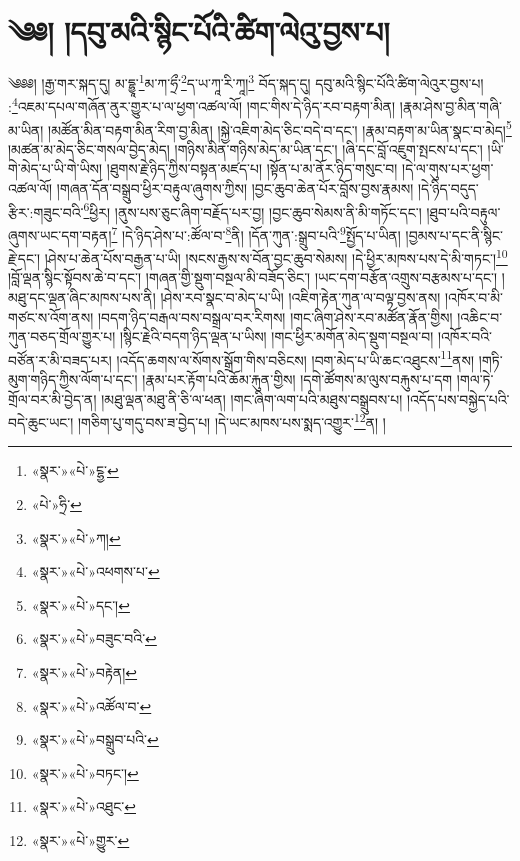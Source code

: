 \chapter{༄༅། །དབུ་མའི་སྙིང་པོའི་ཚིག་ལེའུ་བྱས་པ།}༄༅༅། །རྒྱ་གར་སྐད་དུ། མ་དྷྱཱ་\footnote{«སྣར་»«པེ་»ངྷྱ་}མ་ཀ་ཧྲྀ་\footnote{«པེ་»ཧྲི་}ད་ཡ་ཀཱ་རི་ཀཱ།\footnote{«སྣར་»«པེ་»ཀ།} བོད་སྐད་དུ། དབུ་མའི་སྙིང་པོའི་ཚིག་ལེའུར་བྱས་པ། :\footnote{«སྣར་»«པེ་»འཕགས་པ་}འཇམ་དཔལ་གཞོན་ནུར་གྱུར་པ་ལ་ཕྱག་འཚལ་ལོ། །གང་གིས་དེ་ཉིད་རབ་བརྟག་མིན། །རྣམ་ཤེས་བྱ་མིན་གཞི་མ་ཡིན། །མཚོན་མིན་བརྟག་མིན་རིག་བྱ་མིན། །སྐྱེ་འཇིག་མེད་ཅིང་བདེ་བ་དང་། །རྣམ་བརྟག་མ་ཡིན་སྣང་བ་མེད།\footnote{«སྣར་»«པེ་»དང་།} །མཚན་མ་མེད་ཅིང་གསལ་བྱེད་མེད། །གཉིས་མིན་གཉིས་མེད་མ་ཡིན་དང་། །ཞི་དང་བློ་འཇུག་སྤངས་པ་དང་། །ཡི་གེ་མེད་པ་ཡི་གེ་ཡིས། །ཐུགས་རྗེ་ཉིད་ཀྱིས་བསྟན་མཛད་པ། །སྟོན་པ་མ་ནོར་ཉིད་གསུང་བ། །དེ་ལ་གུས་པར་ཕྱག་འཚལ་ལོ། །གཞན་དོན་བསྒྲུབ་ཕྱིར་བརྟུལ་ཞུགས་ཀྱིས། །བྱང་ཆུབ་ཆེན་པོར་བློས་བྱས་རྣམས། །དེ་ཉིད་བདུད་རྩིར་:གཟུང་བའི་\footnote{«སྣར་»«པེ་»བཟུང་བའི་}ཕྱིར། །ནུས་པས་ཅུང་ཞིག་བརྗོད་པར་བྱ། །བྱང་ཆུབ་སེམས་ནི་མི་གཏོང་དང་། །ཐུབ་པའི་བརྟུལ་ཞུགས་ཡང་དག་བརྟན།\footnote{«སྣར་»«པེ་»བརྟེན།} །དེ་ཉིད་ཤེས་པ་:ཚོལ་བ་\footnote{«སྣར་»«པེ་»འཚོལ་བ་}ནི། །དོན་ཀུན་:སྒྲུབ་པའི་\footnote{«སྣར་»«པེ་»བསྒྲུབ་པའི་}སྤྱོད་པ་ཡིན། །བྱམས་པ་དང་ནི་སྙིང་རྗེ་དང་། །ཤེས་པ་ཆེན་པོས་བརྒྱན་པ་ཡི། །སངས་རྒྱས་ས་བོན་བྱང་ཆུབ་སེམས། །དེ་ཕྱིར་མཁས་པས་དེ་མི་གཏང་།\footnote{«སྣར་»«པེ་»བཏང་།} །བློ་ལྡན་སྙིང་སྟོབས་ཆེ་བ་དང་། །གཞན་གྱི་སྡུག་བསྔལ་མི་བཟོད་ཅིང་། །ཡང་དག་བརྩོན་འགྲུས་བརྩམས་པ་དང་། །མཐུ་དང་ལྡན་ཞིང་མཁས་པས་ནི། །ཤེས་རབ་སྣང་བ་མེད་པ་ཡི། །འཇིག་རྟེན་ཀུན་ལ་བལྟ་བྱས་ནས། །འཁོར་བ་མི་གཙང་ས་འོག་ནས། །བདག་ཉིད་བརྒལ་བས་བསྒྲལ་བར་རིགས། །གང་ཞིག་ཤེས་རབ་མཚོན་རྣོན་གྱིས། །འཆིང་བ་ཀུན་བཅད་གྲོལ་གྱུར་པ། །སྙིང་རྗེའི་བདག་ཉིད་ལྡན་པ་ཡིས། །གང་ཕྱིར་མགོན་མེད་སྡུག་བསྔལ་བ། །འཁོར་བའི་བཙོན་ར་མི་བཟད་པར། །འདོད་ཆགས་ལ་སོགས་སྒྲོག་གིས་བཅིངས། །བག་མེད་པ་ཡི་ཆང་འཐུངས་\footnote{«སྣར་»«པེ་»འཐུང་}ནས། །གཏི་མུག་གཉིད་ཀྱིས་ལོག་པ་དང་། །རྣམ་པར་རྟོག་པའི་ཆོམ་རྐུན་གྱིས། །དགེ་ཚོགས་མ་ལུས་བརྐུས་པ་དག །གལ་ཏེ་གྲོལ་བར་མི་བྱེད་ན། །མཐུ་ལྡན་མཐུ་ནི་ཅི་ལ་ཕན། །གང་ཞིག་ལག་པའི་མཐུས་བསྒྲུབས་པ། །འདོད་པས་བསྐྱེད་པའི་བདེ་ཆུང་ཡང་། །གཅིག་པུ་གདུ་བས་ཟ་བྱེད་པ། །དེ་ཡང་མཁས་པས་སྨད་འགྱུར་\footnote{«སྣར་»«པེ་»གྱུར་}ན། །
